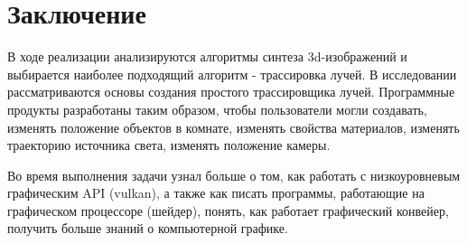\chapter*{Заключение}

В ходе реализации анализируются алгоритмы синтеза 3d-изображений
и выбирается наиболее подходящий алгоритм - трассировка лучей.
В исследовании рассматриваются основы создания простого трассировщика лучей.
Программные продукты разработаны таким образом, чтобы пользователи
могли создавать, изменять положение объектов в комнате, изменять свойства материалов,
изменять траекторию источника света, изменять положение камеры.

Во время выполнения задачи узнал больше о том, как работать с низкоуровневым графическим API
(vulkan), а также как писать программы, работающие на графическом процессоре (шейдер),
понять, как работает графический конвейер, получить больше знаний о компьютерной графике.